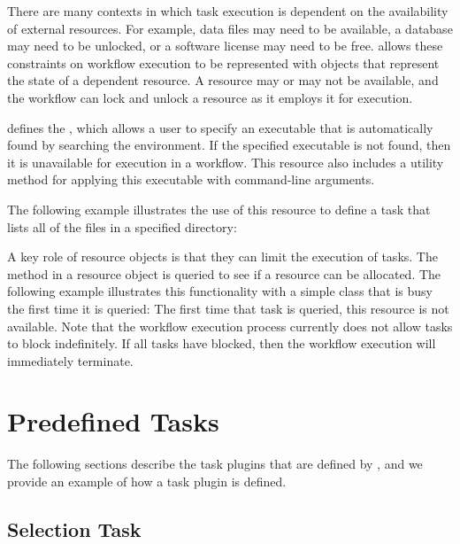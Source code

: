 There are many contexts in which task execution is dependent on the
availability of external resources.  For example, data files may
need to be available, a database may need to be unlocked, or a
software license may need to be free.  \pwsp allows these constraints
on workflow execution to be represented with  objects
that represent the state of a dependent resource.  A resource may
or may not be available, and the workflow can lock and unlock a
resource as it employs it for execution.

\pwsp defines the , which allows a user
to specify an executable that is automatically found by searching
the  environment.  If the specified executable is not
found, then it is unavailable for execution in a workflow.  This
resource also includes a utility method for applying this executable
with command-line arguments.

The following example illustrates the use of this resource to define
a task that lists all of the files in a specified directory:


A key role of resource objects is that they can limit the execution
of tasks.  The  method in a resource object is
queried to see if a resource can be allocated.  The following example illustrates this
functionality with a simple  class that is busy the first time it is queried:
The first time that task  is queried, this resource is not
available.  Note that the \pwsp workflow execution process currently does
not allow tasks to block indefinitely.  If all tasks have blocked, then the workflow execution will immediately terminate.  


\section{Predefined Tasks}
\label{sec:predefined}

The following sections describe the task plugins that are defined
by \pw, and we provide an example of how a task plugin is defined.

\subsection{Selection Task}

